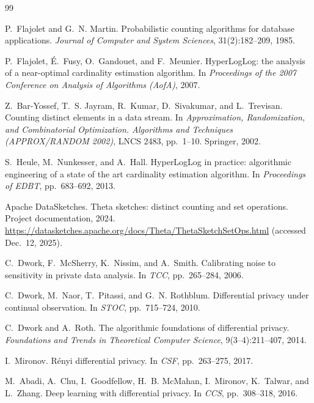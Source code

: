 \documentclass[11pt]{article}
\begin{document}
\begin{thebibliography}{99}

P.~Flajolet and G.~N. Martin.
Probabilistic counting algorithms for database applications.
\textit{Journal of Computer and System Sciences}, 31(2):182--209, 1985.

P.~Flajolet, \'E.~Fusy, O.~Gandouet, and F.~Meunier.
HyperLogLog: the analysis of a near-optimal cardinality estimation algorithm.
In \textit{Proceedings of the 2007 Conference on Analysis of Algorithms (AofA)}, 2007.

Z.~Bar-Yossef, T.~S. Jayram, R.~Kumar, D.~Sivakumar, and L.~Trevisan.
Counting distinct elements in a data stream.
In \textit{Approximation, Randomization, and Combinatorial Optimization. Algorithms and Techniques (APPROX/RANDOM 2002)}, LNCS 2483, pp.~1--10. Springer, 2002.

S.~Heule, M.~Nunkesser, and A.~Hall.
HyperLogLog in practice: algorithmic engineering of a state of the art cardinality estimation algorithm.
In \textit{Proceedings of EDBT}, pp.~683--692, 2013.

Apache DataSketches.
Theta sketches: distinct counting and set operations.
Project documentation, 2024. \url{https://datasketches.apache.org/docs/Theta/ThetaSketchSetOps.html} (accessed Dec.\ 12, 2025).

C.~Dwork, F.~McSherry, K.~Nissim, and A.~Smith.
Calibrating noise to sensitivity in private data analysis.
In \textit{TCC}, pp.~265--284, 2006.

C.~Dwork, M.~Naor, T.~Pitassi, and G.~N. Rothblum.
Differential privacy under continual observation.
In \textit{STOC}, pp.~715--724, 2010.

C.~Dwork and A.~Roth.
The algorithmic foundations of differential privacy.
\textit{Foundations and Trends in Theoretical Computer Science}, 9(3--4):211--407, 2014.

I.~Mironov.
R\'enyi differential privacy.
In \textit{CSF}, pp.~263--275, 2017.

M.~Abadi, A.~Chu, I.~Goodfellow, H.~B. McMahan, I.~Mironov, K.~Talwar, and L.~Zhang.
Deep learning with differential privacy.
In \textit{CCS}, pp.~308--318, 2016.


\end{thebibliography}
\end{document}
